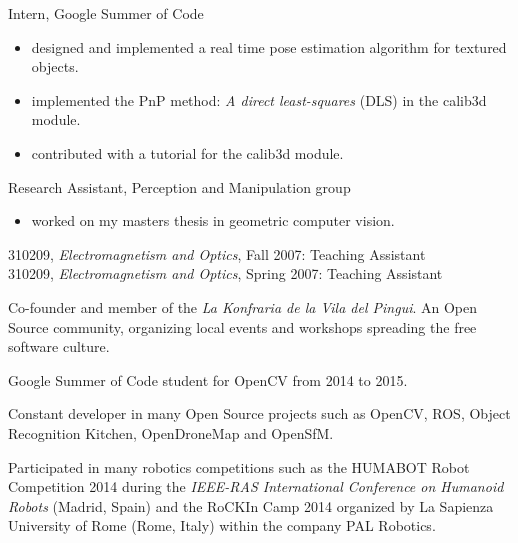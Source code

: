 \documentclass{article}
\begin{document}
\begin{llist}
Intern, Google Summer of Code
\vspace{-0.33cm}
\begin{itemize}
 \item designed and implemented a real time pose estimation algorithm for textured objects.
 \item implemented the PnP method: \textit{A direct least-squares} (DLS) in the calib3d module.
 \item contributed with a tutorial for the calib3d module.
\end{itemize}

Research Assistant, Perception and Manipulation group
\vspace{-0.33cm}
\begin{itemize}
 \item worked on my masters thesis in geometric computer vision.
\end{itemize}


\label{Teaching Experience}

310209, {\em Electromagnetism and Optics}, Fall 2007: Teaching Assistant\\
310209, {\em Electromagnetism and Optics}, Spring 2007: Teaching Assistant\\

\vspace{-0.4cm}

Co-founder and member of the \textit{La Konfraria de la Vila del Pingui}. An Open Source community, organizing local events and workshops spreading the free software culture.

Google Summer of Code student for OpenCV from 2014 to 2015.

Constant developer in many Open Source projects such as OpenCV, ROS, Object Recognition Kitchen, OpenDroneMap and OpenSfM.

Participated in many robotics competitions such as the HUMABOT Robot Competition 2014 during the \textit{IEEE-RAS International Conference on Humanoid Robots} (Madrid, Spain) and the RoCKIn Camp 2014 organized by  La Sapienza University of Rome (Rome, Italy) within the company PAL Robotics.



\end{llist}
\end{document}
